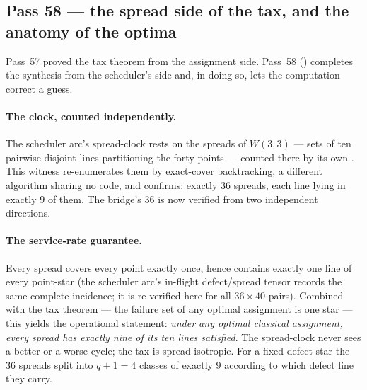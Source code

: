 \documentclass[11pt]{article}
\begin{document}
\subsection{Pass 58 --- the spread side of the tax, and the anatomy of the optima}
\label{sec:capstone-fiftyeight}

Pass~57 proved the tax theorem from the assignment side.  Pass~58
() completes the synthesis from the
scheduler's side and, in doing so, lets the computation correct a guess.

\paragraph{The clock, counted independently.}  The scheduler arc's spread-clock
rests on the spreads of \(W(3,3)\) --- sets of ten pairwise-disjoint lines
partitioning the forty points --- counted there by its own .
This witness re-enumerates them by exact-cover backtracking, a different
algorithm sharing no code, and confirms: exactly \(36\) spreads, each line lying
in exactly \(9\) of them.  The bridge's \(36\) is now verified from two
independent directions.

\paragraph{The service-rate guarantee.}  Every spread covers every point exactly
once, hence contains exactly one line of every point-star (the scheduler arc's
in-flight defect/spread tensor records the same complete incidence; it is
re-verified here for all \(36\times40\) pairs).  Combined with the tax theorem
--- the failure set of any optimal assignment is one star --- this yields the
operational statement: \emph{under any optimal classical assignment, every
spread has exactly nine of its ten lines satisfied}.  The spread-clock never
sees a better or a worse cycle; the tax is spread-isotropic.  For a fixed defect
star the \(36\) spreads split into \(q+1=4\) classes of exactly \(9\) according
to which defect line they carry.
\end{document}

